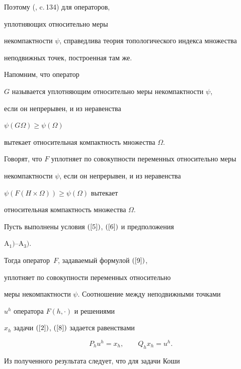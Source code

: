 Поэтому (\cite{5}, c.\,134) для операторов, 


уплотняющих относительно меры 


некомпактности $\psi$, справедлива теория топологического индекса множества


неподвижных точек, построенная там же. 


Напомним, что оператор 


$G$ называется уплотняющим относительно меры некомпактности $\psi$, 


если он непрерывен, и из неравенства


$\psi (G\Omega)\geq \psi (\Omega)$


вытекает относительная компактность множества $\Omega$. 


Говорят, что $F$ уплотняет по совокупности переменных относительно меры


некомпактности $\psi$, если он непрерывен, и из неравенства


$\psi (F(H\times \Omega))\geq \psi (\Omega)$ вытекает


относительная компактность множества $\Omega$. 


 


\begin{thm}\label{th1}


Пусть выполнены условия $(\ref{5})$, $(\ref{6})$ и предположения


$\mathrm A_1)$--$\mathrm A_3)$.


Тогда оператор~$F$, задаваемый формулой $(\ref{9})$,


уплотняет по совокупности переменных относительно


меры некомпактности $\psi$. Соотношение между неподвижными точками


$u^h$ оператора $F(h,\cdot)$ и решениями 


$x_h$ задачи $(\ref{2})$, $(\ref{8})$ задается равенствами


\begin{equation}\label{9'}


P_h u^h = x_h, \qquad Q_h x_h =u^h.


\end{equation}


\end{thm}





Из полученного результата следует, что для задачи Коши


